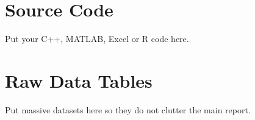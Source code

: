 \section{Source Code}
Put your C++, MATLAB, Excel or R code here.

\section{Raw Data Tables}
Put massive datasets here so they do not clutter the main report.